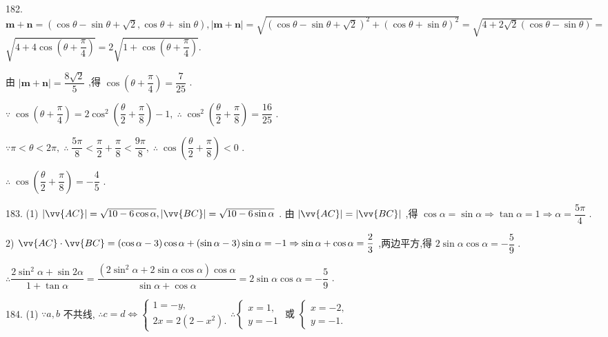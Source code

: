 182. $\mathbf{m} + \mathbf{n} = \left( {\cos \theta  - \sin \theta  + \sqrt{2},\cos \theta  + \sin \theta }\right) ,\left| {\mathbf{m} + \mathbf{n}}\right|  = \sqrt{{\left( \cos \theta  - \sin \theta  + \sqrt{2}\right) }^{2} + {\left( \cos \theta  + \sin \theta \right) }^{2}} = \sqrt{4 + 2\sqrt{2}\left( {\cos \theta  - \sin \theta }\right) } =$  $\sqrt{4 + 4\cos \left( {\theta  + \dfrac{\pi }{4}}\right) } = 2\sqrt{1 + \cos \left( {\theta  + \dfrac{\pi }{4}}\right) }.$

由 $\left| {\mathbf{m} + \mathbf{n}}\right|  = \dfrac{8\sqrt{2}}{5}$ ,得 $\cos \left( {\theta  + \dfrac{\pi }{4}}\right)  = \dfrac{7}{25}$ .

$\because \;\cos \left( {\theta  + \dfrac{\pi }{4}}\right)  = 2{\cos }^{2}\left( {\dfrac{\theta }{2} + \dfrac{\pi }{8}}\right)  - 1,\;\therefore \;{\cos }^{2}\left( {\dfrac{\theta }{2} + \dfrac{\pi }{8}}\right)  = \dfrac{16}{25}$ .

$\because \pi  < \theta  < {2\pi },\;\therefore \;\dfrac{5\pi }{8} < \dfrac{\pi }{2} + \dfrac{\pi }{8} < \dfrac{9\pi }{8},\;\therefore \;\cos \left( {\dfrac{\theta }{2} + \dfrac{\pi }{8}}\right)  < 0$ .

$\therefore \;\cos \left( {\dfrac{\theta }{2} + \dfrac{\pi }{8}}\right)  =  - \dfrac{4}{5}$ .

183. (1) $\left| \vv{AC}\right|  = \sqrt{{10} - 6\cos \alpha },\left| \vv{BC}\right|  = \sqrt{{10} - 6\sin \alpha }$ . 由 $\left| \vv{AC}\right|  = \left| \vv{BC}\right|$ ,得 $\cos \alpha  = \sin \alpha  \Rightarrow  \tan \alpha  = 1 \Rightarrow  \alpha  = \dfrac{5\pi }{4}$ .

2) $\vv{AC} \cdot  \vv{BC} = \left( {\cos \alpha  - 3}\right) \cos \alpha  + \left( {\sin \alpha  - 3}\right) \sin \alpha  =  - 1 \Rightarrow  \sin \alpha  + \cos \alpha  = \dfrac{2}{3}$ ,两边平方,得 $2\sin \alpha \cos \alpha  =  - \dfrac{5}{9}$ .

$\therefore \dfrac{2{\sin }^{2}\alpha  + \sin {2\alpha }}{1 + \tan \alpha } = \dfrac{\left( {2{\sin }^{2}\alpha  + 2\sin \alpha \cos \alpha }\right) \cos \alpha }{\sin \alpha  + \cos \alpha } = 2\sin \alpha \cos \alpha  =  - \dfrac{5}{9}$ .

184. (1) $\because a,b$ 不共线, $\therefore c = d \Leftrightarrow  \left\{  {\begin{array}{l} 1 =  - y, \\  {2x} = 2\left( {2 - {x}^{2}}\right) . \end{array}\therefore \left\{  {\begin{array}{l} x = 1, \\  y =  - 1 \end{array}\text{ 或 }\left\{  \begin{array}{l} x =  - 2, \\  y =  - 1. \end{array}\right. }\right. }\right.$

